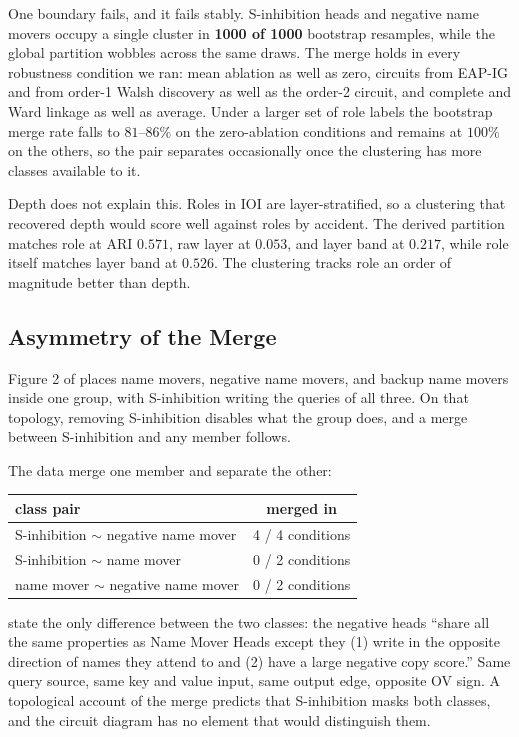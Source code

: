 \documentclass{article}
\begin{document}
One boundary fails, and it fails stably. S-inhibition heads and negative name movers occupy
a single cluster in \textbf{1000 of 1000} bootstrap resamples, while the global partition
wobbles across the same draws. The merge holds in every robustness condition we ran: mean
ablation as well as zero, circuits from EAP-IG and from order-1 Walsh discovery as well as
the order-2 circuit, and complete and Ward linkage as well as average. Under a larger set of
role labels the bootstrap merge rate falls to $81$--$86\%$ on the zero-ablation conditions
and remains at $100\%$ on the others, so the pair separates occasionally once the clustering
has more classes available to it.

Depth does not explain this. Roles in IOI are layer-stratified, so a clustering that
recovered depth would score well against roles by accident. The derived partition matches
role at ARI $0.571$, raw layer at $0.053$, and layer band at $0.217$, while role itself
matches layer band at $0.526$. The clustering tracks role an order of magnitude better than
depth.

\subsection{Asymmetry of the Merge}

Figure 2 of \citet{wang2022ioi} places name movers, negative name movers, and backup name
movers inside one group, with S-inhibition writing the queries of all three. On that
topology, removing S-inhibition disables what the group does, and a merge between
S-inhibition and any member follows.

The data merge one member and separate the other:

\begin{center}
\begin{tabular}{lc}
\toprule
class pair & merged in \\
\midrule
S-inhibition $\sim$ negative name mover & 4 / 4 conditions \\
S-inhibition $\sim$ name mover & 0 / 2 conditions \\
name mover $\sim$ negative name mover & 0 / 2 conditions \\
\bottomrule
\end{tabular}
\end{center}

\citet{wang2022ioi} state the only difference between the two classes: the negative heads
``share all the same properties as Name Mover Heads except they (1) write in the opposite
direction of names they attend to and (2) have a large negative copy score.'' Same query
source, same key and value input, same output edge, opposite OV sign. A topological account
of the merge predicts that S-inhibition masks both classes, and the circuit diagram has no
element that would distinguish them.
\end{document}
